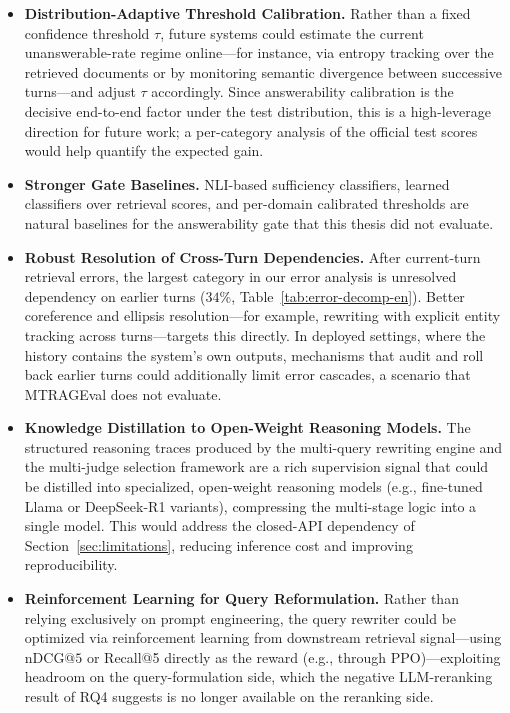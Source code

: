 \begin{itemize}
    \item \textbf{Distribution-Adaptive Threshold Calibration.} Rather than a fixed confidence threshold $\tau$, future systems could estimate the current unanswerable-rate regime online---for instance, via entropy tracking over the retrieved documents or by monitoring semantic divergence between successive turns---and adjust $\tau$ accordingly. Since answerability calibration is the decisive end-to-end factor under the test distribution, this is a high-leverage direction for future work; a per-category analysis of the official test scores would help quantify the expected gain.
    \item \textbf{Stronger Gate Baselines.} NLI-based sufficiency classifiers, learned classifiers over retrieval scores, and per-domain calibrated thresholds are natural baselines for the answerability gate that this thesis did not evaluate.
    \item \textbf{Robust Resolution of Cross-Turn Dependencies.} After current-turn retrieval errors, the largest category in our error analysis is unresolved dependency on earlier turns ($34\%$, Table~\ref{tab:error-decomp-en}). Better coreference and ellipsis resolution---for example, rewriting with explicit entity tracking across turns---targets this directly. In deployed settings, where the history contains the system's own outputs, mechanisms that audit and roll back earlier turns could additionally limit error cascades, a scenario that MTRAGEval does not evaluate.
    \item \textbf{Knowledge Distillation to Open-Weight Reasoning Models.} The structured reasoning traces produced by the multi-query rewriting engine and the multi-judge selection framework are a rich supervision signal that could be distilled into specialized, open-weight reasoning models (e.g., fine-tuned Llama or DeepSeek-R1 variants), compressing the multi-stage logic into a single model. This would address the closed-API dependency of Section~\ref{sec:limitations}, reducing inference cost and improving reproducibility.
    \item \textbf{Reinforcement Learning for Query Reformulation.} Rather than relying exclusively on prompt engineering, the query rewriter could be optimized via reinforcement learning from downstream retrieval signal---using $\text{nDCG@5}$ or Recall@5 directly as the reward (e.g., through PPO)---exploiting headroom on the query-formulation side, which the negative LLM-reranking result of RQ4 suggests is no longer available on the reranking side.
\end{itemize}

